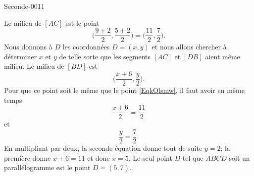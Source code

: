 
\begin{corrige}{Seconde-0011}

    Le milieu de \( [AC]\) est le point
    \begin{equation}        \label{EqkQlsmw}
        \big( \frac{ 9+2 }{2},\frac{ 5+2 }{2} \big)=\big( \frac{ 11 }{2},\frac{ 7 }{2} \big).
    \end{equation}
    Nous donnons à \( D\) les coordonnées \( D=(x,y)\) et nous allons chercher à déterminer \( x\) et \( y\) de telle sorte que les segments \( [AC]\) et \( [DB]\) aient même milieu. Le milieu de \( [BD]\) est
    \begin{equation}
        \big( \frac{ x+6 }{2},\frac{ y }{2} \big).
    \end{equation}
    Pour que ce point soit le même que le point \eqref{EqkQlsmw}, il faut avoir en même temps
    \begin{equation}
        \frac{ x+6 }{ 2 }=\frac{ 11 }{2}
    \end{equation}
    et
    \begin{equation}
        \frac{ y }{ 2 }=\frac{ 7 }{2}.
    \end{equation}
    En multipliant par deux, la seconde équation donne tout de suite \( y=2\); la première donne \( x+6=11\) et donc \( x=5\). Le seul point \( D\) tel que \( ABCD\) soit un parallélogramme est le point \( D=(5,7)\).

\end{corrige}
